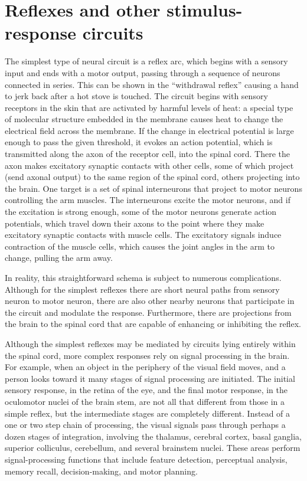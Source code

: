 \documentclass[]{book}
\begin{document}
\hypertarget{reflexes-and-other-stimulus-response-circuits}{%
\section{Reflexes and other stimulus-response circuits}\label{reflexes-and-other-stimulus-response-circuits}}

The simplest type of neural circuit is a reflex arc, which begins with a sensory input and ends with a motor output, passing through a sequence of neurons connected in series. This can be shown in the ``withdrawal reflex'' causing a hand to jerk back after a hot stove is touched. The circuit begins with sensory receptors in the skin that are activated by harmful levels of heat: a special type of molecular structure embedded in the membrane causes heat to change the electrical field across the membrane. If the change in electrical potential is large enough to pass the given threshold, it evokes an action potential, which is transmitted along the axon of the receptor cell, into the spinal cord. There the axon makes excitatory synaptic contacts with other cells, some of which project (send axonal output) to the same region of the spinal cord, others projecting into the brain. One target is a set of spinal interneurons that project to motor neurons controlling the arm muscles. The interneurons excite the motor neurons, and if the excitation is strong enough, some of the motor neurons generate action potentials, which travel down their axons to the point where they make excitatory synaptic contacts with muscle cells. The excitatory signals induce contraction of the muscle cells, which causes the joint angles in the arm to change, pulling the arm away.

In reality, this straightforward schema is subject to numerous complications. Although for the simplest reflexes there are short neural paths from sensory neuron to motor neuron, there are also other nearby neurons that participate in the circuit and modulate the response. Furthermore, there are projections from the brain to the spinal cord that are capable of enhancing or inhibiting the reflex.

Although the simplest reflexes may be mediated by circuits lying entirely within the spinal cord, more complex responses rely on signal processing in the brain. For example, when an object in the periphery of the visual field moves, and a person looks toward it many stages of signal processing are initiated. The initial sensory response, in the retina of the eye, and the final motor response, in the oculomotor nuclei of the brain stem, are not all that different from those in a simple reflex, but the intermediate stages are completely different. Instead of a one or two step chain of processing, the visual signals pass through perhaps a dozen stages of integration, involving the thalamus, cerebral cortex, basal ganglia, superior colliculus, cerebellum, and several brainstem nuclei. These areas perform signal-processing functions that include feature detection, perceptual analysis, memory recall, decision-making, and motor planning.
\end{document}
